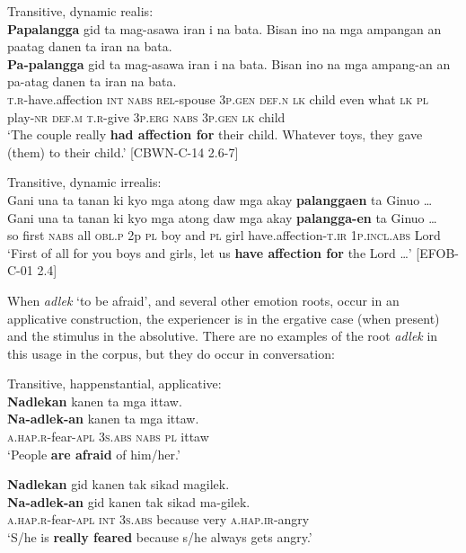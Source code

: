 \ea
Transitive, dynamic realis: \\
\textbf{Papalangga}  gid  ta  mag-asawa  iran  i  na  bata.  Bisan  ino na  mga  ampangan  an  paatag  danen  ta  iran  na  bata. \\\smallskip
\gll \textbf{Pa-palangga}  gid  ta  mag-asawa  iran  i  na  bata.  Bisan  ino na  mga  ampang-an  an  pa-atag  danen  ta  iran  na  bata. \\
\textsc{t.r}-have.affection  \textsc{int}  \textsc{nabs}  \textsc{rel}-spouse  3\textsc{p.gen}  \textsc{def.n}  \textsc{lk}  child  even  what
\textsc{lk}  \textsc{pl}  play-\textsc{nr}  \textsc{def.m}  \textsc{t.r}-give  3\textsc{p.erg}  \textsc{nabs}  3\textsc{p.gen}  \textsc{lk}  child \\
\glt `The couple really \textbf{had affection for} their child. Whatever toys, they gave (them) to their child.’ [CBWN-C-14 2.6-7]
\z

\ea
Transitive, dynamic irrealis: \\
Gani  una  ta  tanan  ki  kyo  mga  atong  daw  mga  akay \textbf{palanggaen}  ta  Ginuo  … \\\smallskip
\gll Gani  una  ta  tanan  ki  kyo  mga  atong  daw  mga  akay \textbf{palangga-en}  ta  Ginuo … \\
so  first  \textsc{nabs}  all  \textsc{obl.p}  2p  \textsc{pl}  boy  and  \textsc{pl}  girl
have.affection-\textsc{t.ir}  1\textsc{p.incl.abs}  Lord \\
\glt `First of all for you boys and girls, let us \textbf{have affection for} the Lord  …’ [EFOB-C-01 2.4]
\z

When \textit{adlek} ‘to be afraid’, and several other emotion roots, occur in an applicative construction, the experiencer is in the ergative case (when present) and the stimulus in the absolutive. There are no examples of the root \textit{adlek} in this usage in the corpus, but they do occur in conversation:

\ea
Transitive, happenstantial, applicative: \\
\textbf{Nadlekan}  kanen  ta  mga  ittaw. \\\smallskip
\gll \textbf{Na-adlek-an}  kanen  ta  mga  ittaw. \\
\textsc{a.hap.r}-fear-\textsc{apl}  3\textsc{s.abs}  \textsc{nabs}  \textsc{pl}  ittaw \\
\glt ‘People \textbf{are afraid} of him/her.’
\z

\ea
\textbf{Nadlekan}  gid  kanen  tak  sikad  magilek. \\\smallskip
\gll \textbf{Na-adlek-an}  gid  kanen  tak  sikad  ma-gilek. \\
\textsc{a.hap.r}-fear-\textsc{apl}  \textsc{int}  3\textsc{s.abs}  because  very  \textsc{a.hap.ir}-angry \\
\glt ‘S/he is \textbf{really feared} because s/he always gets angry.’
\z

